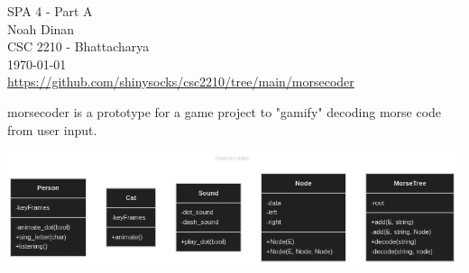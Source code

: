 \documentclass[12pt]{article}
\begin{document}
\setlength{\parindent}{0in}
SPA 4 - Part A \\ Noah Dinan \\ CSC 2210 - Bhattacharya \\ \today \\
\url{https://github.com/shinysocks/csc2210/tree/main/morsecoder}

\vspace{1in}


morsecoder is a prototype for a game project to "gamify" decoding morse code from user input.

\begin{center}
    \includegraphics[scale=0.5]{o-1.png}
\end{center}
\end{document}
